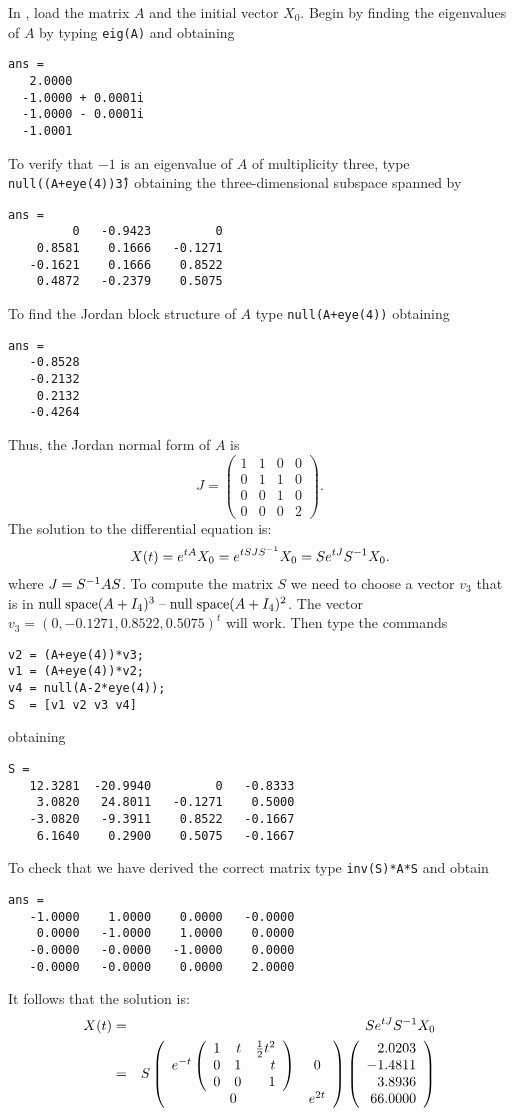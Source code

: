 \documentclass{ximera}
\begin{document}
\soln  In \Matlabp, load the matrix $A$ and the
initial vector $X_0$.  Begin by finding the eigenvalues of $A$ by typing 
{\tt eig(A)} and obtaining
\begin{verbatim}
ans =
   2.0000          
  -1.0000 + 0.0001i
  -1.0000 - 0.0001i
  -1.0001   
\end{verbatim}
To verify that $-1$ is an eigenvalue of $A$ of multiplicity three, type
{\tt null((A+eye(4))\^3)} obtaining the three-dimensional subspace spanned by
\begin{verbatim}
ans =
         0   -0.9423         0
    0.8581    0.1666   -0.1271
   -0.1621    0.1666    0.8522
    0.4872   -0.2379    0.5075
\end{verbatim}
To find the Jordan block structure of $A$ type {\tt null(A+eye(4))} obtaining
\begin{verbatim}
ans =
   -0.8528
   -0.2132
    0.2132
   -0.4264
\end{verbatim}
Thus, the Jordan normal form of $A$ is 
\[
J = \left(\begin{array}{rrrr} 1 & 1 & 0 & 0\\ 0 & 1 & 1 & 0\\ 0 & 0 & 1 & 0\\
0 & 0 & 0 & 2 \end{array}\right).
\]
The solution to the differential equation is:
\[
X(t) = e^{tA}X_0 = e^{tSJS^{-1}}X_0= Se^{tJ}S^{-1} X_0.
\]
where $J=S^{-1} AS$.  To compute the matrix $S$ we need to choose a vector 
$v_3$ that is in ${\rm null\;space}(A+I_4)^3\;\mbox{--}\;{\rm null\;space}(A+I_4)^2$.  The vector 
$v_3 = (0, -0.1271, 0.8522, 0.5075)^t$ will work. Then type the commands
\begin{verbatim}
v2 = (A+eye(4))*v3;
v1 = (A+eye(4))*v2;
v4 = null(A-2*eye(4));
S  = [v1 v2 v3 v4]
\end{verbatim}
obtaining
\begin{verbatim}
S =
   12.3281  -20.9940         0   -0.8333
    3.0820   24.8011   -0.1271    0.5000
   -3.0820   -9.3911    0.8522   -0.1667
    6.1640    0.2900    0.5075   -0.1667
\end{verbatim}
To check that we have derived the correct matrix type {\tt inv(S)*A*S}
and obtain
\begin{verbatim}
ans =
   -1.0000    1.0000    0.0000   -0.0000
    0.0000   -1.0000    1.0000    0.0000
   -0.0000   -0.0000   -1.0000    0.0000
   -0.0000   -0.0000    0.0000    2.0000
\end{verbatim}
It follows that the solution is:
\begin{eqnarray*}
X(t) & = & Se^{tJ}S^{-1} X_0 \\ & = & 
S\left(\begin{array}{cc} e^{-t}\left(\begin{array}{rrr}
     1  &  t   &   \frac{1}{2}t^2\\
    0   &  1   &   t\\
    0   &  0   &   1 \end{array}\right) & 0\\ 0 &e^{2t}\end{array}\right)
\left(\begin{array}{r} 2.0203\\ -1.4811 \\ 3.8936\\ 66.0000 \end{array}\right)
\end{eqnarray*}
\end{document}
